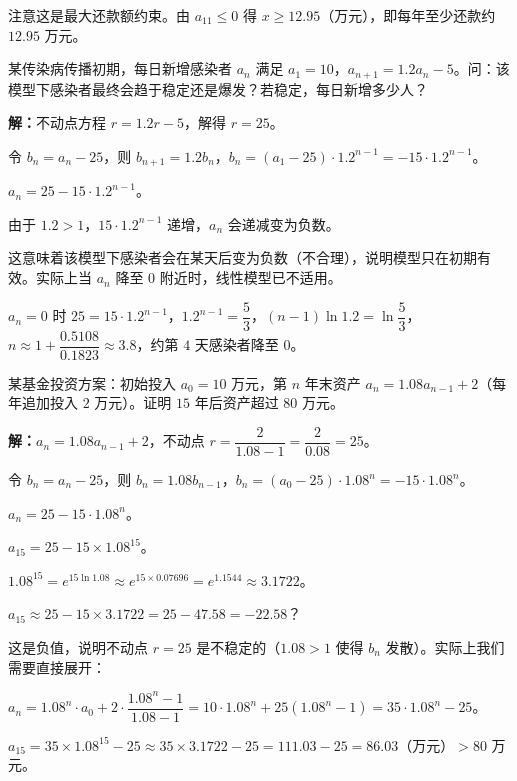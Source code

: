 \documentclass[12pt, a4paper]{ctexart}
\begin{document}
注意这是最大还款额约束。由 $a_{11}\leq 0$ 得 $x \geq 12.95$（万元），即每年至少还款约 $12.95$ 万元。

\begin{appbox}[【应用2】传染病传播模型]
某传染病传播初期，每日新增感染者 $a_n$ 满足 $a_1 = 10$，$a_{n+1} = 1.2a_n - 5$。问：该模型下感染者最终会趋于稳定还是爆发？若稳定，每日新增多少人？
\end{appbox}

\textbf{解：}不动点方程 $r = 1.2r - 5$，解得 $r = 25$。

令 $b_n = a_n - 25$，则 $b_{n+1} = 1.2b_n$，$b_n = (a_1-25)\cdot 1.2^{n-1} = -15\cdot 1.2^{n-1}$。

$a_n = 25 - 15\cdot 1.2^{n-1}$。

由于 $1.2 > 1$，$15\cdot 1.2^{n-1}$ 递增，$a_n$ 会递减变为负数。

这意味着该模型下感染者会在某天后变为负数（不合理），说明模型只在初期有效。实际上当 $a_n$ 降至 $0$ 附近时，线性模型已不适用。

$a_n = 0$ 时 $25 = 15\cdot 1.2^{n-1}$，$1.2^{n-1} = \dfrac{5}{3}$，$(n-1)\ln 1.2 = \ln\dfrac{5}{3}$，$n \approx 1 + \dfrac{0.5108}{0.1823} \approx 3.8$，约第 $4$ 天感染者降至 $0$。

\begin{appbox}[【应用3】投资回报与数列不等式]
某基金投资方案：初始投入 $a_0 = 10$ 万元，第 $n$ 年末资产 $a_n = 1.08a_{n-1} + 2$（每年追加投入 $2$ 万元）。证明 $15$ 年后资产超过 $80$ 万元。
\end{appbox}

\textbf{解：}$a_n = 1.08a_{n-1} + 2$，不动点 $r = \dfrac{2}{1.08-1} = \dfrac{2}{0.08} = 25$。

令 $b_n = a_n - 25$，则 $b_n = 1.08b_{n-1}$，$b_n = (a_0 - 25)\cdot 1.08^n = -15\cdot 1.08^n$。

$a_n = 25 - 15\cdot 1.08^n$。

$a_{15} = 25 - 15\times 1.08^{15}$。

$1.08^{15} = e^{15\ln 1.08} \approx e^{15\times 0.07696} = e^{1.1544} \approx 3.1722$。

$a_{15} \approx 25 - 15\times 3.1722 = 25 - 47.58 = -22.58$？

这是负值，说明不动点 $r=25$ 是不稳定的（$1.08>1$ 使得 $b_n$ 发散）。实际上我们需要直接展开：

$a_n = 1.08^n \cdot a_0 + 2\cdot\dfrac{1.08^n - 1}{1.08 - 1} = 10\cdot 1.08^n + 25(1.08^n - 1) = 35\cdot 1.08^n - 25$。

$a_{15} = 35\times 1.08^{15} - 25 \approx 35\times 3.1722 - 25 = 111.03 - 25 = 86.03$（万元）$> 80$ 万元。\;\checkmark
\end{document}
